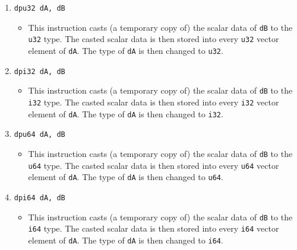 \documentclass{article}
\begin{document}
\begin{itemize}
\begin{enumerate}
			\item \texttt{dpu32 dA, dB}
				\begin{itemize}
				\item This instruction casts (a temporary copy of) the
				scalar data of \texttt{dB} to the \texttt{u32} type.  The
				casted scalar data is then stored into every \texttt{u32}
				vector element of \texttt{dA}.  The type of \texttt{dA} is
				then changed to \texttt{u32}.
				\end{itemize}
			\item \texttt{dpi32 dA, dB}
				\begin{itemize}
				\item This instruction casts (a temporary copy of) the
				scalar data of \texttt{dB} to the \texttt{i32} type.  The
				casted scalar data is then stored into every \texttt{i32}
				vector element of \texttt{dA}.  The type of \texttt{dA} is
				then changed to \texttt{i32}.
				\end{itemize}
			\item \texttt{dpu64 dA, dB}
				\begin{itemize}
				\item This instruction casts (a temporary copy of) the
				scalar data of \texttt{dB} to the \texttt{u64} type.  The
				casted scalar data is then stored into every \texttt{u64}
				vector element of \texttt{dA}.  The type of \texttt{dA} is
				then changed to \texttt{u64}.
				\end{itemize}
			\item \texttt{dpi64 dA, dB}
				\begin{itemize}
				\item This instruction casts (a temporary copy of) the
				scalar data of \texttt{dB} to the \texttt{i64} type.  The
				casted scalar data is then stored into every \texttt{i64}
				vector element of \texttt{dA}.  The type of \texttt{dA} is
				then changed to \texttt{i64}.
				\end{itemize}
			\end{enumerate}
		\end{itemize}
		\newpage
\end{document}
